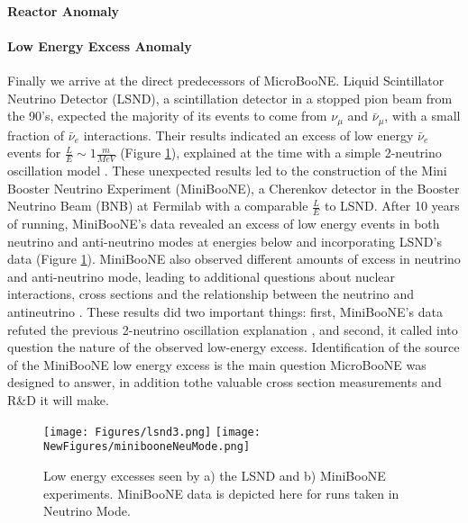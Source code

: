 \documentclass[12pt]{article}
\begin{document}

\paragraph{Reactor Anomaly}

\paragraph{Low Energy Excess Anomaly} %
Finally we arrive at the direct predecessors of MicroBooNE. Liquid Scintillator Neutrino Detector (LSND), a scintillation detector in a stopped pion beam from the 90's, expected the majority of its events to come from $\nu_\mu$ and $\bar{\nu}_\mu$, with a small fraction of $\bar{\nu}_e$ interactions. Their results indicated an excess of low energy $\bar{\nu}_e$ events for $\frac{L}{E} \sim 1 \frac{m}{MeV}$ (Figure \ref{fig:lsnd}), explained at the time with a simple 2-neutrino oscillation model \cite{lsnd}. These unexpected results led to the construction of the Mini Booster Neutrino Experiment (MiniBooNE), a Cherenkov detector in the Booster Neutrino Beam (BNB) at Fermilab with a comparable $\frac{L}{E}$ to LSND. After 10 years of running, MiniBooNE's data revealed an excess of low energy events in both neutrino and anti-neutrino modes at energies below and incorporating LSND's data (Figure \ref{fig:lsnd}).  MiniBooNE also observed different amounts of excess in neutrino and anti-neutrino mode, leading to additional questions about nuclear interactions, cross sections and the relationship between the neutrino and antineutrino \cite{miniboone}.  These results did two important things: first, MiniBooNE's data refuted the previous 2-neutrino oscillation explanation \cite{miniboone}, and second, it called into question the nature of the observed low-energy excess. Identification of the source of the MiniBooNE low energy excess is the main question MicroBooNE was designed to answer, in addition tothe valuable cross section measurements and R\&D it will make. 
\begin{figure}[h!]
\centering
\texttt{[image: Figures/lsnd3.png]}
\hspace{1.5 mm}
\texttt{[image: NewFigures/minibooneNeuMode.png]}
\caption{Low energy excesses seen by a) the LSND and b) MiniBooNE experiments.  MiniBooNE data is depicted here for runs taken in Neutrino Mode.}
\label{fig:lsnd}
\end{figure}
\end{document}
